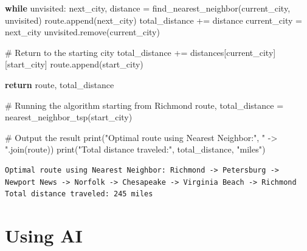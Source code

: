 \documentclass[
  letterpaper,
  DIV=11,
  numbers=noendperiod]{scrreprt}
\newenvironment{Shaded}{\begin{snugshade}}{\end{snugshade}}
\newcommand{\BuiltInTok}[1]{\textcolor[rgb]{0.00,0.23,0.31}{#1}}
\newcommand{\CommentTok}[1]{\textcolor[rgb]{0.37,0.37,0.37}{#1}}
\newcommand{\ControlFlowTok}[1]{\textcolor[rgb]{0.00,0.23,0.31}{\textbf{#1}}}
\newcommand{\NormalTok}[1]{\textcolor[rgb]{0.00,0.23,0.31}{#1}}
\newcommand{\OperatorTok}[1]{\textcolor[rgb]{0.37,0.37,0.37}{#1}}
\newcommand{\StringTok}[1]{\textcolor[rgb]{0.13,0.47,0.30}{#1}}
\begin{document}
\begin{Shaded}
\begin{Highlighting}[]
    \ControlFlowTok{while}\NormalTok{ unvisited:}
\NormalTok{        next\_city, distance }\OperatorTok{=}\NormalTok{ find\_nearest\_neighbor(current\_city, unvisited)}
\NormalTok{        route.append(next\_city)}
\NormalTok{        total\_distance }\OperatorTok{+=}\NormalTok{ distance}
\NormalTok{        current\_city }\OperatorTok{=}\NormalTok{ next\_city}
\NormalTok{        unvisited.remove(current\_city)}
    
    \CommentTok{\# Return to the starting city}
\NormalTok{    total\_distance }\OperatorTok{+=}\NormalTok{ distances[current\_city][start\_city]}
\NormalTok{    route.append(start\_city)}
    
    \ControlFlowTok{return}\NormalTok{ route, total\_distance}

\CommentTok{\# Running the algorithm starting from Richmond}
\NormalTok{route, total\_distance }\OperatorTok{=}\NormalTok{ nearest\_neighbor\_tsp(start\_city)}

\CommentTok{\# Output the result}
\BuiltInTok{print}\NormalTok{(}\StringTok{"Optimal route using Nearest Neighbor:"}\NormalTok{, }\StringTok{" {-}\textgreater{} "}\NormalTok{.join(route))}
\BuiltInTok{print}\NormalTok{(}\StringTok{"Total distance traveled:"}\NormalTok{, total\_distance, }\StringTok{"miles"}\NormalTok{)}
\end{Highlighting}
\end{Shaded}

\begin{verbatim}
Optimal route using Nearest Neighbor: Richmond -> Petersburg -> Newport News -> Norfolk -> Chesapeake -> Virginia Beach -> Richmond
Total distance traveled: 245 miles
\end{verbatim}


\chapter{Using AI}\label{using-ai-2}
\end{document}
